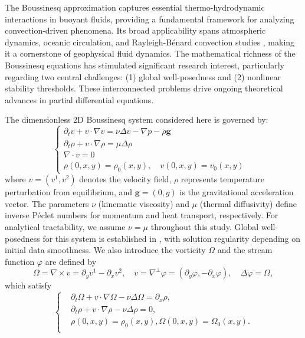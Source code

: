 \documentclass[final, 12pt,reqno]{amsart}
\numberwithin{equation}{section}
\begin{document}
The Boussinesq approximation captures essential thermo-hydrodynamic interactions in buoyant fluids, 
providing a fundamental framework for analyzing convection-driven phenomena. 
Its broad applicability spans atmospheric dynamics, oceanic circulation, 
and Rayleigh-Bénard convection studies \cite{Constantin.1996,Doering.1995,Majda.2003}, 
making it a cornerstone of geophysical fluid dynamics. 
The mathematical richness of the Boussinesq equations has stimulated significant research interest, 
particularly regarding two central challenges: 
(1) global well-posedness and (2) nonlinear stability thresholds. 
These interconnected problems drive ongoing theoretical advances in partial differential equations.

The dimensionless 2D Boussinesq system considered here is governed by:
\begin{equation}\label{1.1}
\begin{cases}
\partial_t v + v \cdot \nabla v = \nu \Delta v - \nabla p - \rho \mathbf{g} & \\
\partial_t \rho + v \cdot \nabla \rho = \mu \Delta \rho & \\
\nabla \cdot v = 0 & \\
\rho(0,x,y) = \rho_0(x,y), \quad v(0,x,y) = v_0(x,y)
\end{cases}
\end{equation}
where $v = (v^1, v^2)$ denotes the velocity field, 
$\rho$ represents temperature perturbation from equilibrium, 
and $\mathbf{g} = (0,g)$ is the gravitational acceleration vector. 
The parameters $\nu$ (kinematic viscosity) and $\mu$ (thermal diffusivity) 
define inverse Péclet numbers for momentum and heat transport, respectively. 
For analytical tractability, we assume $\nu = \mu$ throughout this study. 
Global well-posedness for this system is established in \cite{Abidi2007,Adhikari2016,Hou2005}, 
with solution regularity depending on initial data smoothness.
 We also introduce the vorticity $\Omega$ and the
stream function $\varphi$ are defined by
$$\Omega=\nabla\times v=\partial_y v^1-\partial_x v^2,\quad v=\nabla^{\perp}\varphi=(\partial_y\varphi,-\partial_x \varphi),\quad \Delta \varphi=\Omega,$$ which satisfy
\begin{equation}\label{1.2}
        \left\{
        \begin{aligned}
            &\partial _t\Omega +v\cdot\nabla \Omega-\nu \Delta \Omega=\partial_x\rho ,\\
            &\partial_t\rho +v\cdot\nabla \rho-\nu \Delta \rho=0,\\
            &\rho(0,x,y)=\rho_{0}(x,y),\Omega(0,x,y)=\Omega_{0}(x,y).\\
        \end{aligned}
        \right.
\end{equation}
\end{document}
